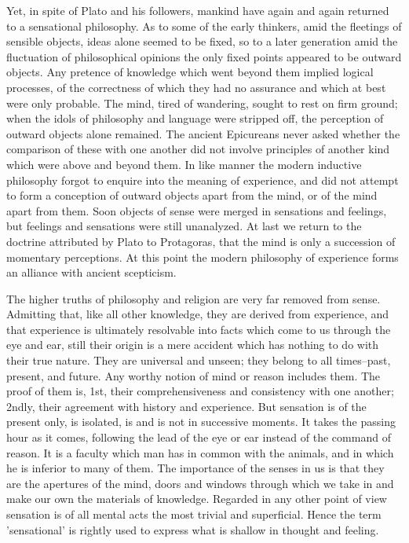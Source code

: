 Yet, in spite of Plato and his followers, mankind have again and again
returned to a sensational philosophy. As to some of the early thinkers,
amid the fleetings of sensible objects, ideas alone seemed to be fixed,
so to a later generation amid the fluctuation of philosophical opinions
the only fixed points appeared to be outward objects. Any pretence
of knowledge which went beyond them implied logical processes, of the
correctness of which they had no assurance and which at best were only
probable. The mind, tired of wandering, sought to rest on firm ground;
when the idols of philosophy and language were stripped off, the
perception of outward objects alone remained. The ancient Epicureans
never asked whether the comparison of these with one another did not
involve principles of another kind which were above and beyond them. In
like manner the modern inductive philosophy forgot to enquire into
the meaning of experience, and did not attempt to form a conception of
outward objects apart from the mind, or of the mind apart from them.
Soon objects of sense were merged in sensations and feelings, but
feelings and sensations were still unanalyzed. At last we return to
the doctrine attributed by Plato to Protagoras, that the mind is only a
succession of momentary perceptions. At this point the modern philosophy
of experience forms an alliance with ancient scepticism.

The higher truths of philosophy and religion are very far removed from
sense. Admitting that, like all other knowledge, they are derived from
experience, and that experience is ultimately resolvable into facts
which come to us through the eye and ear, still their origin is a
mere accident which has nothing to do with their true nature. They
are universal and unseen; they belong to all times--past, present, and
future. Any worthy notion of mind or reason includes them. The proof of
them is, 1st, their comprehensiveness and consistency with one another;
2ndly, their agreement with history and experience. But sensation is of
the present only, is isolated, is and is not in successive moments. It
takes the passing hour as it comes, following the lead of the eye or
ear instead of the command of reason. It is a faculty which man has in
common with the animals, and in which he is inferior to many of them.
The importance of the senses in us is that they are the apertures of the
mind, doors and windows through which we take in and make our own the
materials of knowledge. Regarded in any other point of view sensation
is of all mental acts the most trivial and superficial. Hence the term
'sensational' is rightly used to express what is shallow in thought and
feeling.

